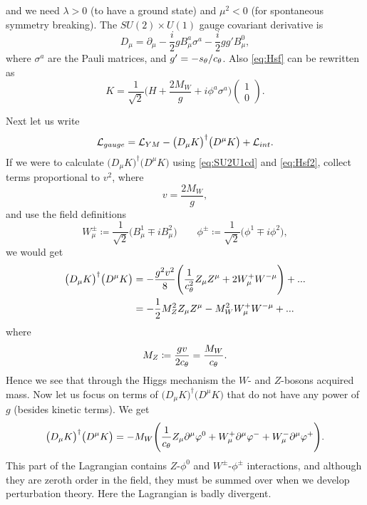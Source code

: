 and we need $\lambda>0$ (to have a ground state) and $\mu^2<0$ (for spontaneous
symmetry breaking). The $SU(2)\times U(1)$ gauge covariant derivative is
\begin{equation}
  \label{eq:SU2U1cd}
  D_{\mu}=\partial_{\mu}-\frac{i}{2}gB_{\mu}^{a}\sigma^{a}
                       -\frac{i}{2}gg'B_{\mu}^{0},
\end{equation}
where $\sigma^{a}$ are the Pauli matrices, and $g'=-s_{\theta}/c_{\theta}$.
Also \eqref{eq:Hsf} can be rewritten as
\begin{equation}
  \label{eq:Hsf2}
  K=\frac{1}{\sqrt{2}}\Big(H+\frac{2M_W}{g}+i\phi^{a}\sigma^{a}\Big)
  \left(\begin{array}{c}
    1 \\
    0
  \end{array}\right).
\end{equation}

Next let us write
\begin{equation}
  \mathcal{L}_{gauge}=\mathcal{L}_{YM}-\big(D_{\mu}K\big)^{\dagger}\big(D^{\mu}K\big)
                 +\mathcal{L}_{int}.
\end{equation}
If we were to calculate $\big(D_{\mu}K\big)^{\dagger}\big(D^{\mu}K\big)$ using
\eqref{eq:SU2U1cd} and \eqref{eq:Hsf2}, collect terms proportional to $v^2$,
where
\begin{equation}
  v=\frac{2M_W}{g},
\end{equation}
and use the field definitions
\begin{equation}
  W_{\mu}^{\pm}\coloneqq\frac{1}{\sqrt{2}}\big(B_{\mu}^1 \mp iB_{\mu}^2\big)
  \qquad
  \phi^{\pm}\coloneqq\frac{1}{\sqrt{2}}\big(\phi^1 \mp i\phi^2 \big),
\end{equation}
we would get
\begin{equation}
  \begin{aligned}
    \big(D_{\mu}K\big)^{\dagger}\big(D^{\mu}K\big)&=-\frac{g^2 v^2}{8}
      \Bigg(\frac{1}{c_{\theta}^2}Z_{\mu}Z^{\mu}+2W^+_{\mu}W^{-\mu}\Bigg)+...\\
    &=-\frac{1}{2}M_Z^2 Z_{\mu}Z^{\mu}-M_W^2 W_{\mu}^+ W^{-\mu}+...
  \end{aligned}
\end{equation}
where
\begin{equation}
  M_Z \coloneqq\frac{gv}{2c_{\theta}}=\frac{M_W}{c_{\theta}}.
\end{equation}
Hence we see that through the Higgs mechanism the $W$- and $Z$-bosons
acquired mass.
Now let us focus on terms of $(D_{\mu}K\big)^{\dagger}\big(D^{\mu}K\big)$ that
do not have any power of $g$ (besides kinetic terms). We get
\begin{equation}
  \label{eq:zmp}
  \big(D_{\mu}K\big)^{\dagger}\big(D^{\mu}K\big)=-M_W \Bigg(
     \frac{1}{c_{\theta}}Z_{\mu}\partial^{\mu}\varphi^0 +W_{\mu}^+ \partial^{\mu}\varphi^-
     +W_{\mu}^- \partial^{\mu}\varphi^+ \Bigg).
\end{equation}
This part of the Lagrangian contains $Z$-$\phi^0$ and
$W^{\pm}$-$\phi^{\pm}$ interactions, and although they are zeroth order
in the field, they must be summed over when we develop perturbation theory.
Here the Lagrangian is badly divergent.

